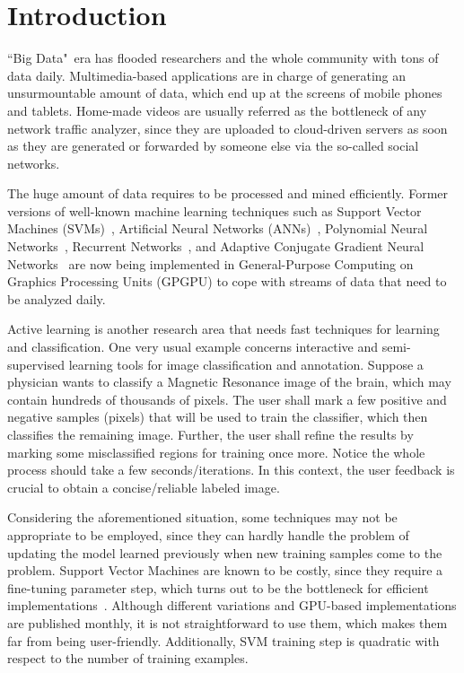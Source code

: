 \section{Introduction}
\label{s.introduction}

 ``Big Data"\ era has flooded researchers and the whole community with tons of data daily. Multimedia-based applications are in charge of generating an unsurmountable amount of data, which end up at the screens of mobile phones and tablets. Home-made videos are usually referred as the bottleneck of any network traffic analyzer, since they are uploaded to cloud-driven servers as soon as they are generated or forwarded by someone else via the so-called social networks.

The huge amount of data requires to be processed and mined efficiently. Former versions of well-known machine learning techniques such as Support Vector Machines (SVMs)~\cite{CortesML:95}, Artificial Neural Networks (ANNs)~\cite{HungNeuro:93,AdeliMLN:94}, Polynomial Neural Networks~\cite{LinTSMCS:15a}, Recurrent Networks~\cite{LinTSMCS:15b,LiuTSMCS:16}, and Adaptive Conjugate Gradient Neural Networks~\cite{AdeliAMC:94,AdeliJSA:93} are now being implemented in General-Purpose Computing on Graphics Processing Units (GPGPU) to cope with streams of data that need to be analyzed daily.

Active learning is another research area that needs fast techniques for learning and classification. One very usual example concerns interactive and semi-supervised learning tools for image classification and annotation. Suppose a physician wants to classify a Magnetic Resonance image of the brain, which may contain hundreds of thousands of pixels. The user shall mark a few positive and negative samples (pixels) that will be used to train the classifier, which then classifies the remaining image. Further, the user shall refine the results by marking some misclassified regions for training once more. Notice the whole process should take a few seconds/iterations. In this context, the user feedback is crucial to obtain a concise/reliable labeled image.

Considering the aforementioned situation, some techniques may not be appropriate to be employed, since they can hardly handle the problem of updating the model learned previously when new training samples come to the problem. Support Vector Machines are known to be costly, since they require a fine-tuning parameter step, which turns out to be the bottleneck for efficient implementations~\cite{ChouCACIE:15}. Although different variations and GPU-based implementations are published monthly, it is not straightforward to use them, which makes them far from being user-friendly. Additionally, SVM training step is quadratic with respect to the number of training examples.

